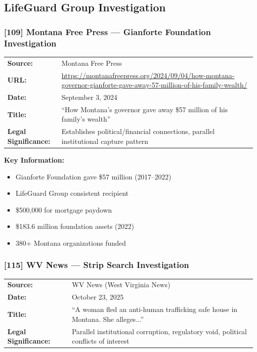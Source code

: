 \documentclass[11pt,letterpaper]{article}
\newcommand{\citeref}[1]{\textbf{\color{NavyBlue}[#1]}}
\begin{document}
\subsection{LifeGuard Group Investigation}

\subsubsection{\citeref{109} Montana Free Press --- Gianforte Foundation Investigation}

\begin{tabular}{@{}p{1.4in}p{4.6in}@{}}
\textbf{Source:} & Montana Free Press\\
\textbf{URL:} & \url{https://montanafreepress.org/2024/09/04/how-montana-governor-gianforte-gave-away-57-million-of-his-family-wealth/}\\
\textbf{Date:} & September 3, 2024\\
\textbf{Title:} & ``How Montana's governor gave away \$57 million of his family's wealth''\\
\textbf{Legal Significance:} & Establishes political/financial connections, parallel institutional capture pattern\\
\end{tabular}

\vspace{0.1in}

\textbf{Key Information:}
\begin{itemize}[leftmargin=*]
\item Gianforte Foundation gave \$57 million (2017--2022)
\item LifeGuard Group consistent recipient
\item \$500,000 for mortgage paydown
\item \$183.6 million foundation assets (2022)
\item 380+ Montana organizations funded
\end{itemize}

\subsubsection{\citeref{115} WV News --- Strip Search Investigation}

\begin{tabular}{@{}p{1.4in}p{4.6in}@{}}
\textbf{Source:} & WV News (West Virginia News)\\
\textbf{Date:} & October 23, 2025\\
\textbf{Title:} & ``A woman fled an anti-human trafficking safe house in Montana. She alleges...''\\
\textbf{Legal Significance:} & Parallel institutional corruption, regulatory void, political conflicts of interest\\
\end{tabular}
\end{document}
